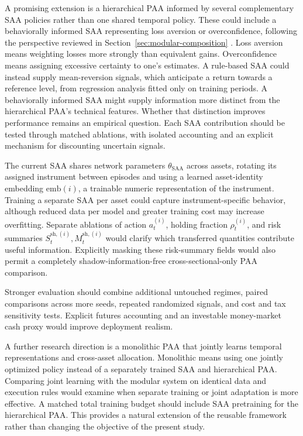 A promising extension is a hierarchical PAA informed by several complementary SAA policies rather than one shared temporal policy. These could include a behaviorally informed SAA representing loss aversion or overconfidence, following the perspective reviewed in Section~\ref{sec:modular-composition} \cite{Charkestani.2026}. Loss aversion means weighting losses more strongly than equivalent gains. Overconfidence means assigning excessive certainty to one's estimates. A rule-based SAA could instead supply mean-reversion signals, which anticipate a return towards a reference level, from regression analysis fitted only on training periods. A behaviorally informed SAA might supply information more distinct from the hierarchical PAA's technical features. Whether that distinction improves performance remains an empirical question. Each SAA contribution should be tested through matched ablations, with isolated accounting and an explicit mechanism for discounting uncertain signals.

The current SAA shares network parameters \(\theta_{\mathrm{SAA}}\) across assets, rotating its assigned instrument between episodes and using a learned asset-identity embedding \(\mathrm{emb}(i)\), a trainable numeric representation of the instrument. Training a separate SAA per asset could capture instrument-specific behavior, although reduced data per model and greater training cost may increase overfitting. Separate ablations of action \(a_t^{(i)}\), holding fraction \(\rho_t^{(i)}\), and risk summaries \(S_t^{\mathrm{sh},(i)},M_t^{\mathrm{sh},(i)}\) would clarify which transferred quantities contribute useful information. Explicitly masking these risk-summary fields would also permit a completely shadow-information-free cross-sectional-only PAA comparison.

Stronger evaluation should combine additional untouched regimes, paired comparisons across more seeds, repeated randomized signals, and cost and tax sensitivity tests. Explicit futures accounting and an investable money-market cash proxy would improve deployment realism.

A further research direction is a monolithic PAA that jointly learns temporal representations and cross-asset allocation. Monolithic means using one jointly optimized policy instead of a separately trained SAA and hierarchical PAA. Comparing joint learning with the modular system on identical data and execution rules would examine when separate training or joint adaptation is more effective. A matched total training budget should include SAA pretraining for the hierarchical PAA. This provides a natural extension of the reusable framework rather than changing the objective of the present study.
